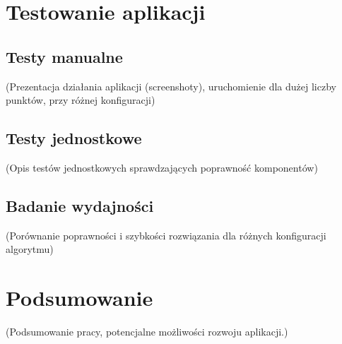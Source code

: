 \documentclass[12pt,a4paper]{report}
\begin{document}
	\chapter{Testowanie aplikacji}
	\section{Testy manualne}
	(Prezentacja działania aplikacji (screenshoty), uruchomienie dla dużej liczby punktów, przy różnej konfiguracji)
	\section{Testy jednostkowe}
	\label{sec:testy_jednostkowe}
	(Opis testów jednostkowych sprawdzających poprawność komponentów)
	\section{Badanie wydajności}
	(Porównanie poprawności i szybkości rozwiązania dla różnych konfiguracji algorytmu)
	
	\chapter*{Podsumowanie}
		(Podsumowanie pracy, potencjalne możliwości rozwoju aplikacji.)
	
	
\end{document}
